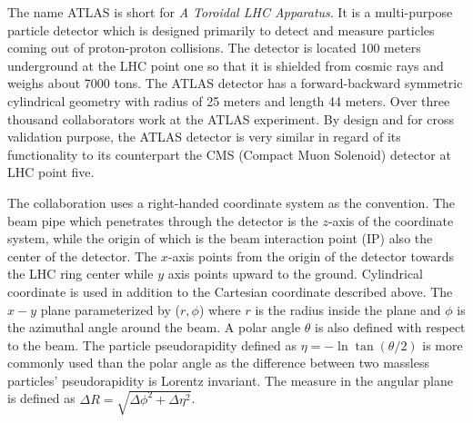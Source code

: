 The name ATLAS is short for \textit{A Toroidal LHC Apparatus}. It is a multi-purpose particle detector which is designed primarily to detect and measure particles coming out of proton-proton collisions. The detector is located 100 meters underground at the LHC point one so that it is shielded from cosmic rays and weighs about 7000 tons. The ATLAS detector has a forward-backward symmetric cylindrical geometry with radius of 25 meters and length 44 meters. Over three thousand collaborators work at the ATLAS experiment. By design and for cross validation purpose, the ATLAS detector is very similar in regard of its functionality to its counterpart the CMS (Compact Muon Solenoid) detector at LHC point five. 

The collaboration uses a right-handed coordinate system as the convention. The beam pipe which penetrates through the detector is the $z$-axis of the coordinate system, while the origin of which is the beam interaction point (IP) also the center of the detector. The $x$-axis points from the origin of the detector towards the LHC ring center while $y$ axis points upward to the ground. Cylindrical coordinate is used in addition to the Cartesian coordinate described above. The $x-y$ plane parameterized by ($r,\phi$) where $r$ is the radius inside the plane and $\phi$ is the azimuthal angle around the beam. A polar angle $\theta$ is also defined with respect to the beam. The particle pseudorapidity defined as $\eta = -\ln \tan(\theta/2)$ is more commonly used than the polar angle as the difference between two massless particles' pseudorapidity is Lorentz invariant. The measure in the angular plane is defined as $\Delta R = \sqrt{\Delta \phi^2+\Delta \eta^2}$.

